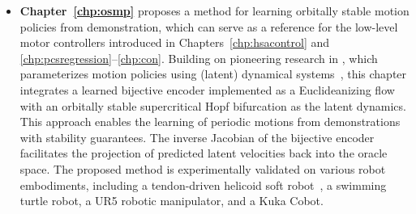\begin{itemize}
    \item \textbf{Chapter~\ref{chp:osmp}} proposes a method for learning orbitally stable motion policies from demonstration, which can serve as a reference for the low-level motor controllers introduced in Chapters~\ref{chp:hsacontrol} and \ref{chp:pcsregression}–\ref{chp:con}. Building on pioneering research in , which parameterizes motion policies using (latent) dynamical systems~\citep{ijspeert2013dynamical, rana2020euclideanizing}, this chapter integrates a learned bijective encoder implemented as a Euclideanizing flow~\citep{dinh2016density, rana2020euclideanizing} with an orbitally stable supercritical Hopf bifurcation as the latent dynamics. This approach enables the learning of periodic motions from demonstrations with stability guarantees. The inverse Jacobian of the bijective encoder facilitates the projection of predicted latent velocities back into the oracle space. The proposed method is experimentally validated on various robot embodiments, including a tendon-driven helicoid soft robot~\citep{guan2023trimmed}, a swimming turtle robot, a UR5 robotic manipulator, and a Kuka \gls{Cobot}.
\end{itemize}

